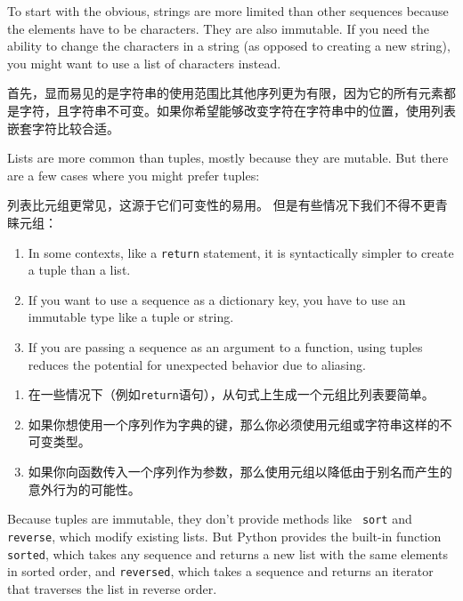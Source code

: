 To start with the obvious, strings are more limited than other
sequences because the elements have to be characters.  They are
also immutable.  If you need the ability to change the characters
in a string (as opposed to creating a new string), you might
want to use a list of characters instead.

首先，显而易见的是字符串的使用范围比其他序列更为有限，因为它的所有元素都是字符，且字符串不可变。如果你希望能够改变字符在字符串中的位置，使用列表嵌套字符比较合适。

Lists are more common than tuples, mostly because they are mutable.
But there are a few cases where you might prefer tuples:

列表比元组更常见，这源于它们可变性的易用。  但是有些情况下我们不得不更青睐元组：

\begin{enumerate}

\item In some contexts, like a {\tt return} statement, it is
syntactically simpler to create a tuple than a list.

\item If you want to use a sequence as a dictionary key, you
have to use an immutable type like a tuple or string.

\item If you are passing a sequence as an argument to a function,
using tuples reduces the potential for unexpected behavior
due to aliasing.

\end{enumerate}

\begin{enumerate}

\item 在一些情况下（例如\lstinline{return}语句），从句式上生成一个元组比列表要简单。

\item 如果你想使用一个序列作为字典的键，那么你必须使用元组或字符串这样的不可变类型。

\item 如果你向函数传入一个序列作为参数，那么使用元组以降低由于别名而产生的意外行为的可能性。

\end{enumerate}

Because tuples are immutable, they don't provide methods like {\tt
  sort} and {\tt reverse}, which modify existing lists.  But Python
provides the built-in function {\tt sorted}, which takes any sequence
and returns a new list with the same elements in sorted order, and
{\tt reversed}, which takes a sequence and returns an iterator that
traverses the list in reverse order.

